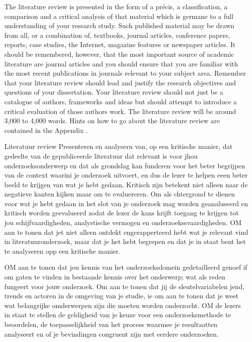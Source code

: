 			The literature review is presented in the form of a précis, a classification, a comparison and a critical analysis of that material which is germane to a full understanding of your research study. Such published material may be drawn from all, or a combination of, textbooks, journal articles, conference papers, reports, case studies, the Internet, magazine features or newspaper articles. It should be remembered, however, that the most important source of academic literature are journal articles and you should ensure that you are familiar with the most recent publications in journals relevant to your subject area.
			Remember that your literature review should lead and justify the research objectives and questions of your dissertation. Your literature review should not just be a catalogue of authors, frameworks and ideas but should attempt to introduce a critical evaluation of those authors work.
			The literature review will be around 3,000 to 4,000 words. Hints on how to go about the literature review are contained in the Appendix .
			
			Literatuur review
			Presenteren en analysern van, op een kritische manier, dat gedeelte van de gepubliceerde literatuur dat relevant is voor jhou onderzoeksonderwerp en dat als grondslag kan funderen voor het beter begrijpen van de context waarini je onderzoek uitvoert, en dus de lezer te helpen  eeen beter beeld te krijgen van wat je hebt gedaan,
			Kritisch zijn betekent niet alleen naar de negatieve kanten kijken maar om te evaluereren.
			Om als chtergrond te dienen voor wat je hebt gedaan in het slot van je onderzoek mag worden geanaluseerd en kritisch worden geevalueerd zodat de lezer de kans krijft toegang te krijgen tot jou schijfvaardigheden, analystische vermogen en onderzoekssvaardigheden.
			OM aan te tonen dat jet niet alleen ontdekt engerapperteerd hebt wat je relevant vind in literatuuronderzoek, maar dat je het hebt begrepen en dat je in staat bent het te analyseren opp een kritische manier.
			
			
			OM aan te tonen dat jou kennis van het onderzoeksdomein gedetailleerd genoef if om gaten te vinden in bestaande kennis over het onderwerp; wat als reden fungeert voor jouw onderzoek. Om aan te tonen dat jij de sleutelvariabelen jend, trends en actoren in de omgeving van je studie, ie om aan te tonen dat je weet wat belangrijke omderwerpen zijn  die moeten worden onderzocht.
			OM de lezers in staat te stellen de geldigheid van je keuze voor een onderzoeksmethode te beoordelen, de toepasselijkheid van het process waarmee je resultaatten analyseert en of je bevindingen congruent zijn met eerdere onderzoeken.
			
